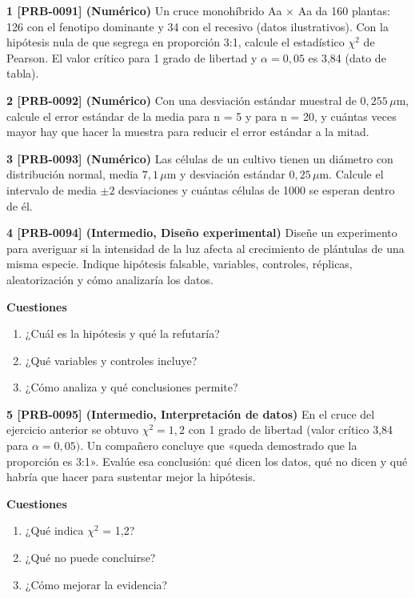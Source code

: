 \documentclass{book}
\begin{document}
\begin{tcolorbox}[title={Ejercicios}, studiumworked, breakable]

\noindent\textbf{1 [PRB-0091] (Numérico)}
Un cruce monohíbrido Aa \(\times\) Aa da 160 plantas: 126 con el fenotipo dominante y 34 con el recesivo (datos ilustrativos). Con la hipótesis nula de que segrega en proporción 3:1, calcule el estadístico \(\chi^{2}\) de Pearson. El valor crítico para 1 grado de libertad y \(\alpha = 0,05\) es 3,84 (dato de tabla).


\noindent\textbf{2 [PRB-0092] (Numérico)}
Con una desviación estándar muestral de \(0{,}255\,\mu\mathrm{m}\), calcule el error estándar de la media para n = 5 y para n = 20, y cuántas veces mayor hay que hacer la muestra para reducir el error estándar a la mitad.


\noindent\textbf{3 [PRB-0093] (Numérico)}
Las células de un cultivo tienen un diámetro con distribución normal, media \(7{,}1\,\mu\mathrm{m}\) y desviación estándar \(0{,}25\,\mu\mathrm{m}\). Calcule el intervalo de media \(\pm 2\) desviaciones y cuántas células de 1000 se esperan dentro de él.


\noindent\textbf{4 [PRB-0094] (Intermedio, Diseño experimental)}
Diseñe un experimento para averiguar si la intensidad de la luz afecta al crecimiento de plántulas de una misma especie. Indique hipótesis falsable, variables, controles, réplicas, aleatorización y cómo analizaría los datos.


\noindent\textbf{Cuestiones}
\begin{enumerate}
\item ¿Cuál es la hipótesis y qué la refutaría?
\item ¿Qué variables y controles incluye?
\item ¿Cómo analiza y qué conclusiones permite?
\end{enumerate}

\noindent\textbf{5 [PRB-0095] (Intermedio, Interpretación de datos)}
En el cruce del ejercicio anterior se obtuvo \(\chi^{2} = 1,2\) con 1 grado de libertad (valor crítico 3,84 para \(\alpha = 0,05)\). Un compañero concluye que «queda demostrado que la proporción es 3:1». Evalúe esa conclusión: qué dicen los datos, qué no dicen y qué habría que hacer para sustentar mejor la hipótesis.


\noindent\textbf{Cuestiones}
\begin{enumerate}
\item ¿Qué indica \(\chi^{2}\) = 1,2?
\item ¿Qué no puede concluirse?
\item ¿Cómo mejorar la evidencia?
\end{enumerate}


\end{tcolorbox}
\end{document}
